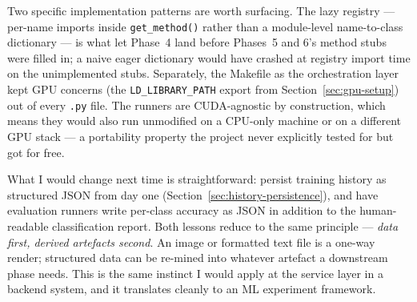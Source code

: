 \documentclass[11pt,a4paper]{article}
\begin{document}
Two specific implementation patterns are worth surfacing. The lazy registry — per-name imports inside \texttt{get\_method()} rather than a module-level name-to-class dictionary — is what let Phase~4 land before Phases~5 and 6's method stubs were filled in; a naive eager dictionary would have crashed at registry import time on the unimplemented stubs. Separately, the Makefile as the orchestration layer kept GPU concerns (the \texttt{LD\_LIBRARY\_PATH} export from Section~\ref{sec:gpu-setup}) out of every \texttt{.py} file. The runners are CUDA-agnostic by construction, which means they would also run unmodified on a CPU-only machine or on a different GPU stack — a portability property the project never explicitly tested for but got for free.

What I would change next time is straightforward: persist training history as structured JSON from day one (Section~\ref{sec:history-persistence}), and have evaluation runners write per-class accuracy as JSON in addition to the human-readable classification report. Both lessons reduce to the same principle — \emph{data first, derived artefacts second}. An image or formatted text file is a one-way render; structured data can be re-mined into whatever artefact a downstream phase needs. This is the same instinct I would apply at the service layer in a backend system, and it translates cleanly to an ML experiment framework.



\end{document}
